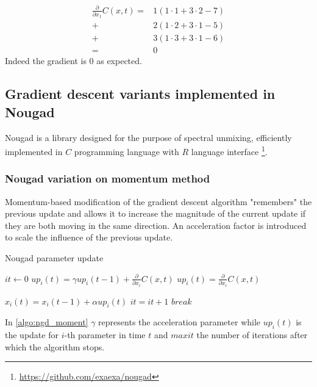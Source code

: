   \[\begin{aligned}
  \frac{\partial}{\partial x_1} C(x,t)=&1(1 \cdot 1+3 \cdot 2-7)\\
  +&2(1 \cdot 2+3 \cdot 1-5)\\
  +&3(1\cdot 3+3 \cdot 1-6)\\
  =&0
 \end{aligned}\]
Indeed the gradient is 0 as expected. 


\subsection{Gradient descent variants implemented in Nougad}
Nougad is a library designed for the purpose of spectral unmixing, efficiently implemented in $C$ programming language with $R$ language interface \footnote{\url{https://github.com/exaexa/nougad}}. 
\subsubsection{Nougad variation on momentum method}
Momentum-based modification of the gradient descent algorithm "remembers" the previous update and allows it to increase the magnitude of the current update if they are both moving in the same direction. An acceleration factor is introduced to scale the influence of the previous update.

\begin{algorithm}
\caption{Nougad parameter update}
\label{algo:ngd_moment}
\begin{algorithmic}
\State $it \gets 0$
        \State $up_i(t) = \gamma up_i(t-1)+\frac{\partial}{\partial x_i} C(x,t)$
    \Else
        \State $up_i(t) = \frac{\partial}{\partial x_i} C(x,t)$
    \EndIf 

    \State $x_i(t) = x_i(t-1)+\alpha up_i(t)$
    \State $it = it+1$
        \State $break$
    \EndIf 
\EndWhile
\end{algorithmic}
\end{algorithm}


In \cref{algo:ngd_moment} $\gamma$ represents the acceleration parameter while $up_i(t)$ is the update for $i$-th parameter in time $t$ and $maxit$ the number of iterations after which the algorithm stops.

